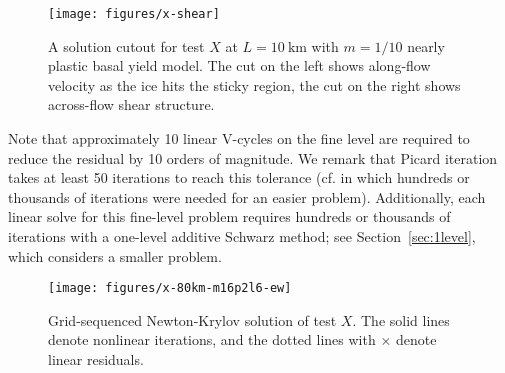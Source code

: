 \documentclass[draft,lineno,jgrga]{AGUTeX}
\begin{document}
\begin{article}
\begin{figure}
  \texttt{[image: figures/x-shear]}
  \centering\caption{A solution cutout for test $X$ at $L=\SI{10}{\kilo\metre}$ with $m=1/10$ nearly plastic basal yield model.
    The cut on the left shows along-flow velocity as the ice hits the sticky region, the cut on the right shows across-flow shear structure.}\label{fig:xshear}
\end{figure}

Note that approximately 10 linear V-cycles on the fine level are required to reduce the residual by 10 orders of magnitude.
We remark that Picard iteration takes at least 50 iterations to reach this tolerance (cf. \cite{desmedt2010using} in which hundreds or thousands of iterations were needed for an easier problem).  Additionally, each linear solve for this fine-level problem requires hundreds or thousands of iterations with a one-level additive Schwarz method; see Section~\ref{sec:1level}, which considers a smaller problem.

\begin{figure}
  \texttt{[image: figures/x-80km-m16p2l6-ew]}
  \centering\caption{Grid-sequenced Newton-Krylov solution of test $X$.  The solid lines denote nonlinear iterations, and the dotted lines with $\times$ denote linear residuals.}\label{fig:xgridseq}
\end{figure}


\end{article}
\end{document}
